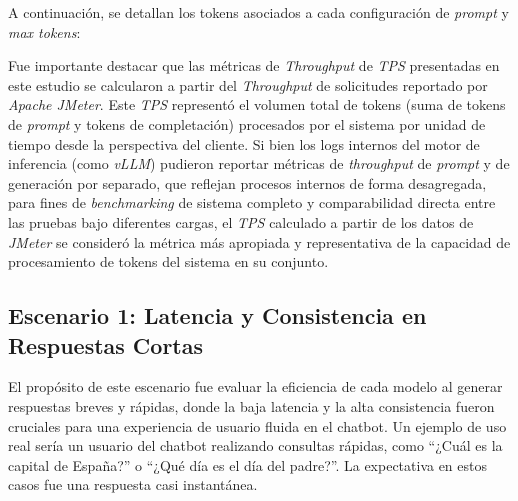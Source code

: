 A continuación, se detallan los tokens asociados a cada configuración de \textit{prompt} y \textit{max tokens}:

\begin{table}[H]
\centering
\renewcommand{\arraystretch}{1.2}
\setlength{\tabcolsep}{4pt}
\caption{Tokens asociados a cada configuración de \textit{prompt} y \textit{max tokens}.}
\label{tab:tokens_por_solicitud}
\end{table}

Fue importante destacar que las métricas de \textit{Throughput} de \textit{TPS} presentadas en este estudio se calcularon a partir del \textit{Throughput} de solicitudes reportado por \textit{Apache JMeter}. Este \textit{TPS} representó el volumen total de tokens (suma de tokens de \textit{prompt} y tokens de completación) procesados por el sistema por unidad de tiempo desde la perspectiva del cliente. Si bien los logs internos del motor de inferencia (como \textit{vLLM}) pudieron reportar métricas de \textit{throughput} de \textit{prompt} y de generación por separado, que reflejan procesos internos de forma desagregada, para fines de \textit{benchmarking} de sistema completo y comparabilidad directa entre las pruebas bajo diferentes cargas, el \textit{TPS} calculado a partir de los datos de \textit{JMeter} se consideró la métrica más apropiada y representativa de la capacidad de procesamiento de tokens del sistema en su conjunto.

\subsection{Escenario 1: Latencia y Consistencia en Respuestas Cortas}
El propósito de este escenario fue evaluar la eficiencia de cada modelo al generar respuestas breves y rápidas, donde la baja latencia y la alta consistencia fueron cruciales para una experiencia de usuario fluida en el chatbot. Un ejemplo de uso real sería un usuario del chatbot realizando consultas rápidas, como ``¿Cuál es la capital de España?'' o ``¿Qué día es el día del padre?''. La expectativa en estos casos fue una respuesta casi instantánea.

